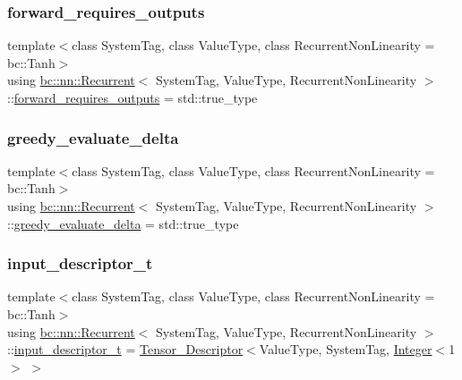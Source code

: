 \subsubsection{\texorpdfstring{forward\+\_\+requires\+\_\+outputs}{forward\_requires\_outputs}}
{\footnotesize\ttfamily template$<$class System\+Tag, class Value\+Type, class Recurrent\+Non\+Linearity = bc\+::\+Tanh$>$ \\
using \hyperlink{structbc_1_1nn_1_1Recurrent}{bc\+::nn\+::\+Recurrent}$<$ System\+Tag, Value\+Type, Recurrent\+Non\+Linearity $>$\+::\hyperlink{structbc_1_1nn_1_1Recurrent_a5d8408035c0c266c1f2b0f4172f7d842}{forward\+\_\+requires\+\_\+outputs} =  std\+::true\+\_\+type}

\mbox{\label{structbc_1_1nn_1_1Recurrent_ab97457c29f8666ce83b9ea94b0ad1053}} 
\subsubsection{\texorpdfstring{greedy\+\_\+evaluate\+\_\+delta}{greedy\_evaluate\_delta}}
{\footnotesize\ttfamily template$<$class System\+Tag, class Value\+Type, class Recurrent\+Non\+Linearity = bc\+::\+Tanh$>$ \\
using \hyperlink{structbc_1_1nn_1_1Recurrent}{bc\+::nn\+::\+Recurrent}$<$ System\+Tag, Value\+Type, Recurrent\+Non\+Linearity $>$\+::\hyperlink{structbc_1_1nn_1_1Recurrent_ab97457c29f8666ce83b9ea94b0ad1053}{greedy\+\_\+evaluate\+\_\+delta} =  std\+::true\+\_\+type}

\mbox{\label{structbc_1_1nn_1_1Recurrent_a5b3abbc190059309b64aff068cc38f6a}} 
\subsubsection{\texorpdfstring{input\+\_\+descriptor\+\_\+t}{input\_descriptor\_t}}
{\footnotesize\ttfamily template$<$class System\+Tag, class Value\+Type, class Recurrent\+Non\+Linearity = bc\+::\+Tanh$>$ \\
using \hyperlink{structbc_1_1nn_1_1Recurrent}{bc\+::nn\+::\+Recurrent}$<$ System\+Tag, Value\+Type, Recurrent\+Non\+Linearity $>$\+::\hyperlink{structbc_1_1nn_1_1Recurrent_a5b3abbc190059309b64aff068cc38f6a}{input\+\_\+descriptor\+\_\+t} =  \hyperlink{structbc_1_1nn_1_1Tensor__Descriptor}{Tensor\+\_\+\+Descriptor}$<$Value\+Type, System\+Tag, \hyperlink{structbc_1_1traits_1_1Integer}{Integer}$<$1$>$ $>$}

